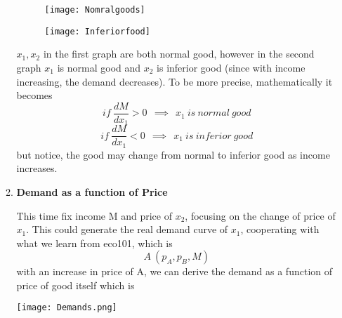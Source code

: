 \documentclass[10pt]{article}
\newenvironment{changemargin}[2]{%
  \begin{list}{}{%
    \setlength{\topsep}{0pt}%
    \setlength{\leftmargin}{#1}%
    \setlength{\rightmargin}{#2}%
    \setlength{\listparindent}{\parindent}%
    \setlength{\itemindent}{\parindent}%
    \setlength{\parsep}{\parskip}%
  }%
  \item[]}{\end{list}}
\begin{document}
\begin{changemargin}{-0.125in}{0in}
\begin{enumerate}
\begin{enumerate}
             \begin{figure}[ht]
              \setlength{\abovecaptionskip}{0.cm}
              \setlength{\belowcaptionskip}{-0.cm}
                \centering
              \begin{minipage}[b]{0.45\linewidth}
              \texttt{[image: Nomralgoods]}
            
              \label{fig:minipage1}
              \end{minipage}
              \quad
              \begin{minipage}[b]{0.45\linewidth}
              \texttt{[image: Inferiorfood]}
              
              \label{fig:minipage2}
              \end{minipage}
             \end{figure}
            
            \smallskip
            
            $x_1,x_2$ in the first graph are both normal good, however in the second graph $x_1$ is normal good and $x_2$ is inferior good (since with income increasing, the demand decreases). To be more precise, mathematically it becomes
            \[
            if \: \frac{dM}{dx_1} > 0 \:\: \implies \:\: x_1 \:is\: normal \:good
            \]
            \[
            if \: \frac{dM}{dx_1} < 0 \:\: \implies \:\: x_1 \:is\: inferior \:good
            \]
            but notice, the good may change from normal to inferior good as income increases. 
            \medskip
            
            \item \textbf{Demand as a function of Price}
            
            \smallskip
            
            This time fix income M and price of $x_2$, focusing on the change of price of $x_1$. This could generate the real demand curve of $x_1$, cooperating with what we learn from eco101, which is 
            \[
            A\:(p_A,p_B,M)
            \]
            with an increase in price of A, we can derive the demand as a function of price of good itself which is 
            
            \medskip
            
            \medskip
            
            \begin{center}
            	\texttt{[image: Demands.png]}
            \end{center}
            

\end{enumerate}
\end{enumerate}
\end{changemargin}
\end{document}
